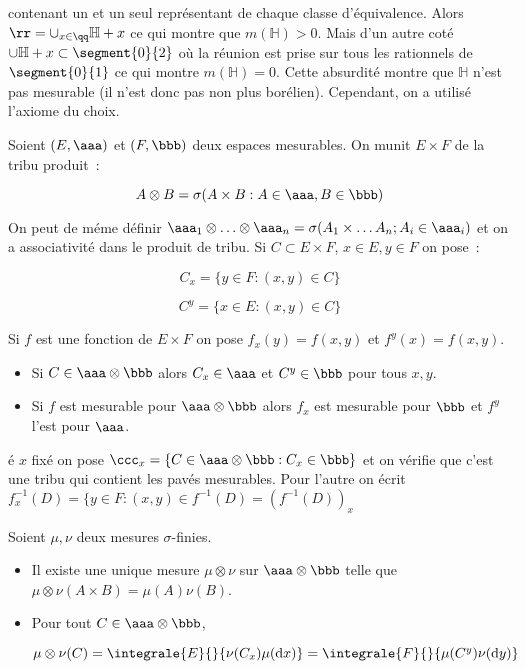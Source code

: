 contenant un et un seul représentant de chaque classe d'équivalence. Alors $\rr = \cup_{x\in \qq} \mathbb{H}+x$
ce qui montre que $m(\mathbb{H}) > 0$. Mais d'un autre coté $\cup \mathbb{H} + x \subset \segment{0}{2}$ o\`u la 
réunion est prise sur tous les rationnels de $\segment{0}{1}$ ce qui montre $m(\mathbb{H}) = 0$. Cette absurdité
montre que $\mathbb{H}$ n'est pas mesurable (il n'est donc pas non plus borélien). Cependant, on a utilisé l'axiome du
choix.\par
{}
Soient $(E,\aaa)$ et $(F,\bbb)$ deux espaces mesurables. On munit $E\times F$ de la tribu produit~:\par
$$A\otimes B = \sigma(A\times B : A\in \aaa, B\in \bbb)$$\par
On peut de méme définir $\aaa_1\otimes\ldots \otimes \aaa_n = \sigma(A_1\times\ldots A_n; A_i\in \aaa_i)$ et on a associativité
dans le produit de tribu.
Si $C\subset E\times F$, $x\in E, y\in F$ on pose~:\par
$$C_x = \lbrace y\in F : (x,y)\in C\rbrace$$\par
$$C^y = \lbrace x\in E : (x,y)\in C\rbrace$$\par
Si $f$ est une fonction de $E\times F$ on pose $f_x(y) = f(x,y)$ et $f^y(x) = f(x,y)$.\par
\prop{} 
\begin{itemize}
\item{} Si $C\in \aaa\otimes\bbb$ alors $C_x\in \aaa$ et $C^y\in \bbb$ pour tous $x,y$.
\item{} Si $f$ est mesurable pour $\aaa\otimes \bbb$ alors $f_x$ est mesurable pour $\bbb$ et $f^y$ l'est pour $\aaa$.
\end{itemize}
\dem é $x$ fixé on pose $\ccc_x = \lbrace C\in \aaa\otimes\bbb : C_x\in \bbb\rbrace$ et on vérifie que c'est une tribu
qui contient les pavés mesurables. Pour l'autre on écrit $f_x^{-1}(D) = \lbrace y\in F : (x,y)\in f^{-1}(D) = (f^{-1}(D))_x$\par
{} Soient $\mu, \nu$ deux mesures $\sigma$-finies.
\begin{itemize} 
\item{} Il existe une unique mesure $\mu\otimes\nu$ sur $\aaa\otimes\bbb$ telle que $\mu\otimes\nu(A\times B) = \mu(A)\nu(B)$.
\item{} Pour tout $C\in \aaa\otimes \bbb$,\par
$\mu\otimes \nu(C) = \integrale{E}{}{\nu(C_x)\mu(\mathrm{d}x)} = \integrale{F}{}{\mu(C^y)\nu(\mathrm{d}y)}$
\end{itemize}\par
